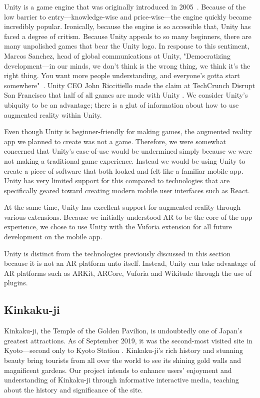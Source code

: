 \documentclass[a4paper, 10pt, american, titlepage]{article}
\begin{document}
Unity is a game engine that was originally introduced in
2005~\autocite{axon2016}. Because of the low barrier to entry---knowledge-wise
and price-wise---the engine quickly became incredibly popular. Ironically,
because the engine is so accessible that, Unity has faced a degree of critism.
Because Unity appeals to so many beginners, there are many unpolished games that
bear the Unity logo. In response to this sentiment, Marcos Sanchez, head of
global communications at Unity, "Democratizing development---in our minds, we
don't think is the wrong thing, we think it's the right thing. You want more
people understanding, and everyone’s gotta start somewhere"~\autocite{axon2016}.
Unity CEO John Riccitiello made the claim at TechCrunch Disrupt San Francisco
that half of all games are made with Unity \autocite{dillet2018}. We consider
Unity's ubiquity to be an advantage; there is a glut of information about how to
use augmented reality within Unity.

Even though Unity is beginner-friendly for making games, the augmented reality
app we planned to create was not a game. Therefore, we were somewhat concerned
that Unity's ease-of-use would be undermined simply because we were not making a
traditional game experience. Instead we would be using Unity to create a piece
of software that both looked and felt like a familiar mobile app. Unity has very
limited support for this compared to technologies that are specifically geared
toward creating modern mobile user interfaces such as React.

At the same time, Unity has excellent support for augmented reality through
various extensions. Because we initially understood AR to be the core of the app
experience, we chose to use Unity with the Vuforia extension for all future
development on the mobile app.

Unity is distinct from the technologies previously discussed in this section
because it is not an AR platform unto itself. Instead, Unity can take advantage
of AR platforms such as ARKit, ARCore, Vuforia and Wikitude through the use of
plugins.

\subsection{Kinkaku-ji}
\label{sec:kinkaku-ji}

Kinkaku-ji, the Temple of the Golden Pavilion, is undoubtedly one of Japan's
greatest attractions.  As of September 2019, it was the second-most visited site
in Kyoto---second only to Kyoto Station \autocite{japanguide2019}. Kinkaku-ji's
rich history and stunning beauty bring tourists from all over the world to see
its shining gold walls and magnificent gardens. Our project intends to enhance
users' enjoyment and understanding of Kinkaku-ji through informative interactive
media, teaching about the history and significance of the site.
\end{document}
